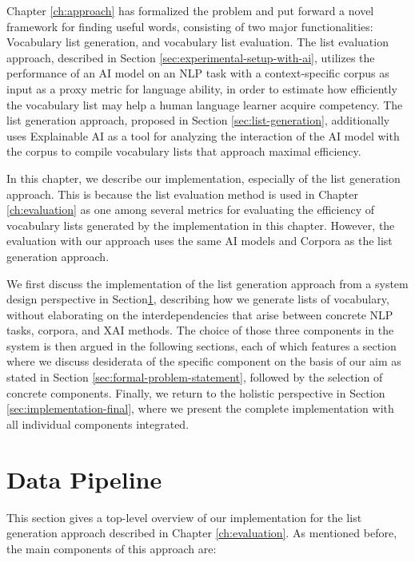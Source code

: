 Chapter \ref{ch:approach} has formalized the problem and put forward a novel framework for finding useful words, consisting of two major functionalities:
Vocabulary list generation, and vocabulary list evaluation.
The list evaluation approach, described in Section \ref{sec:experimental-setup-with-ai}, utilizes the performance of an AI model on an NLP task with a context-specific corpus as input as a proxy metric for language ability, in order to estimate how efficiently the vocabulary list may help a human language learner acquire competency.
The list generation approach, proposed in Section \ref{sec:list-generation}, additionally uses Explainable AI as a tool for analyzing the interaction of the AI model with the corpus to compile vocabulary lists that approach maximal efficiency.

In this chapter, we describe our implementation, especially of the list generation approach.
This is because the list evaluation method is used in Chapter \ref{ch:evaluation} as one among several metrics for evaluating the efficiency of vocabulary lists generated by the implementation in this chapter.
However, the evaluation with our approach uses the same AI models and Corpora as the list generation approach.

We first discuss the implementation of the list generation approach from a system design perspective in Section\ref{sec:data-pipeline}, describing how we generate lists of vocabulary, without elaborating on the interdependencies that arise between concrete NLP tasks, corpora, and XAI methods.
The choice of those three components in the system is then argued in the following sections, each of which features a section where we discuss desiderata of the specific component on the basis of our aim as stated in Section \ref{sec:formal-problem-statement}, followed by the selection of concrete components.
Finally, we return to the holistic perspective in Section \ref{sec:implementation-final}, where we present the complete implementation with all individual components integrated.

\section{Data Pipeline} \label{sec:data-pipeline}

This section gives a top-level overview of our implementation for the list generation approach described in Chapter \ref{ch:evaluation}.
As mentioned before, the main components of this approach are:

